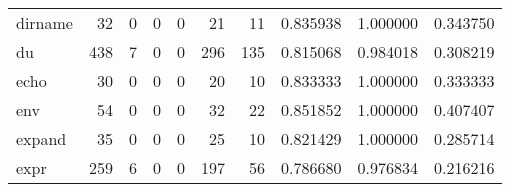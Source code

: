 \begin{tabular}{lrrrrrrrrr}
dirname   &                                        32 &                                                  0 &                                                  0 &                                                  0 &                                                 21 &                                                 11 &                                           0.835938 &                               1.000000 &                             0.343750 \\
du        &                                       438 &                                                  7 &                                                  0 &                                                  0 &                                                296 &                                                135 &                                           0.815068 &                               0.984018 &                             0.308219 \\
echo      &                                        30 &                                                  0 &                                                  0 &                                                  0 &                                                 20 &                                                 10 &                                           0.833333 &                               1.000000 &                             0.333333 \\
env       &                                        54 &                                                  0 &                                                  0 &                                                  0 &                                                 32 &                                                 22 &                                           0.851852 &                               1.000000 &                             0.407407 \\
expand    &                                        35 &                                                  0 &                                                  0 &                                                  0 &                                                 25 &                                                 10 &                                           0.821429 &                               1.000000 &                             0.285714 \\
expr      &                                       259 &                                                  6 &                                                  0 &                                                  0 &                                                197 &                                                 56 &                                           0.786680 &                               0.976834 &                             0.216216 \\

\end{tabular}
